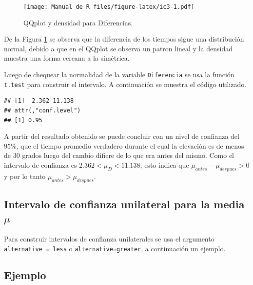\documentclass[10pt,]{krantz}
\makeatletter
\newenvironment{Shaded}{\begin{snugshade}}{\end{snugshade}}
\newcommand{\KeywordTok}[1]{\textcolor[rgb]{0.13,0.29,0.53}{\textbf{#1}}}
\newcommand{\DataTypeTok}[1]{\textcolor[rgb]{0.13,0.29,0.53}{#1}}
\newcommand{\FloatTok}[1]{\textcolor[rgb]{0.00,0.00,0.81}{#1}}
\newcommand{\OtherTok}[1]{\textcolor[rgb]{0.56,0.35,0.01}{#1}}
\newcommand{\OperatorTok}[1]{\textcolor[rgb]{0.81,0.36,0.00}{\textbf{#1}}}
\newcommand{\NormalTok}[1]{#1}
\newenvironment{kframe}{%
\medskip{}
\setlength{\fboxsep}{.8em}
 \def\at@end@of@kframe{}%
 \ifinner\ifhmode%
  \def\at@end@of@kframe{\end{minipage}}%
  \begin{minipage}{\columnwidth}%
 \fi\fi%
 \def\FrameCommand##1{\hskip\@totalleftmargin \hskip-\fboxsep
 \colorbox{shadecolor}{##1}\hskip-\fboxsep
     \hskip-\linewidth \hskip-\@totalleftmargin \hskip\columnwidth}%
 \MakeFramed {\advance\hsize-\width
   \@totalleftmargin\z@ \linewidth\hsize
   \@setminipage}}%
 {\par\unskip\endMakeFramed%
 \at@end@of@kframe}
\renewenvironment{Shaded}{\begin{kframe}}{\end{kframe}}
\makeatother
\begin{document}
\begin{figure}
\centering
\texttt{[image: Manual\_de\_R\_files/figure-latex/ic3-1.pdf]}
\caption{\label{fig:ic3}QQplot y densidad para Diferencias.}
\end{figure}

De la Figura \ref{fig:ic3} se observa que la diferencia de los tiempos
sigue una distribución normal, debido a que en el QQplot se observa un
patron lineal y la densidad muestra una forma cercana a la simétrica.

Luego de chequear la normalidad de la variable \texttt{Diferencia} se
usa la función \texttt{t.test} para construir el intervalo. A
continuación se muestra el código utilizado.

\begin{Shaded}
\end{Shaded}

\begin{verbatim}
## [1]  2.362 11.138
## attr(,"conf.level")
## [1] 0.95
\end{verbatim}

A partir del resultado obtenido se puede concluir con un nivel de
confianza del \(95\%\), que el tiempo promedio verdadero durante el cual
la elevación es de menos de 30 grados luego del cambio difiere de lo que
era antes del mismo. Como el intervalo de confianza es
\(2.362< \mu_D < 11.138\), esto indica que
\(\mu_{antes} - \mu_{despues}>0\) y por lo tanto
\(\mu_{antes} > \mu_{despues}\).

\subsection{\texorpdfstring{Intervalo de confianza unilateral para la
media
\(\mu\)}{Intervalo de confianza unilateral para la media \textbackslash{}mu}}\label{intervalo-de-confianza-unilateral-para-la-media-mu}

Para construir intervalos de confianza unilaterales se usa el argumento
\texttt{alternative\ =\ \textquotesingle{}less\textquotesingle{}} o
\texttt{alternative=\textquotesingle{}greater\textquotesingle{}}, a
continuación un ejemplo.

\subsection*{Ejemplo}\label{ejemplo-57}
\end{document}
